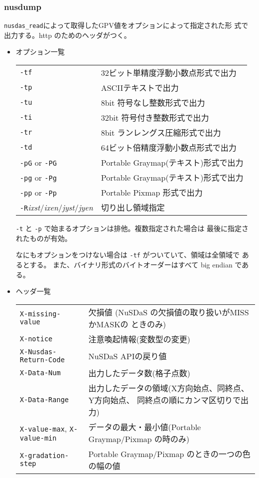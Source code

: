 \subsubsection{nusdump}
\verb|nusdas_read|によって取得したGPV値をオプションによって指定された形
式で出力する。http のためのヘッダがつく。
\begin{itemize}
\item オプション一覧\\
\begin{tabular}{ll}
{\tt -tf} & 32ビット単精度浮動小数点形式で出力\\
{\tt -tp} & ASCIIテキストで出力\\
{\tt -tu} & 8bit 符号なし整数形式で出力\\
{\tt -ti} & 32bit 符号付き整数形式で出力\\
{\tt -tr} & 8bit ランレングス圧縮形式で出力 \\
{\tt -td} & 64ビット倍精度浮動小数点形式で出力 \\
{\tt -pG} or {\tt -PG} & Portable Graymap(テキスト)形式で出力 \\
{\tt -pg} or {\tt -Pg} & Portable Graymap(テキスト)形式で出力 \\
{\tt -pp} or {\tt -Pp} & Portable Pixmap 形式で出力\\
{\tt -R}{\it ixst}/{\it ixen}/{\it jyst}/{\it jyen} & 切り出し領域指定
\end{tabular}

{\tt -t} と {\tt -p} で始まるオプションは排他。複数指定された場合は
最後に指定されたものが有効。

なにもオプションをつけない場合は {\tt -tf} がついていて、領域は全領域で
あるとする。
また、バイナリ形式のバイトオーダーはすべて big endian である。

\item ヘッダ一覧\\
\begin{tabular}{lp{10cm}}
{\tt X-missing-value} & 欠損値 (NuSDaS の欠損値の取り扱いがMISSかMASKの
 ときのみ)\\
{\tt X-notice} & 注意喚起情報(変数型の変更)\\
{\tt X-Nusdas-Return-Code} & NuSDaS APIの戻り値\\
{\tt X-Data-Num} & 出力したデータ数(格子点数) \\
{\tt X-Data-Range} & 出力したデータの領域(X方向始点、同終点、Y方向始点、
 同終点の順にカンマ区切りで出力)\\
{\tt X-value-max}, {\tt X-value-min} & データの最大・最小値(Portable
 Graymap/Pixmap の時のみ)\\
{\tt X-gradation-step}& Portable Graymap/Pixmap のときの一つの色の幅の値\\
\end{tabular}
\end{itemize}


